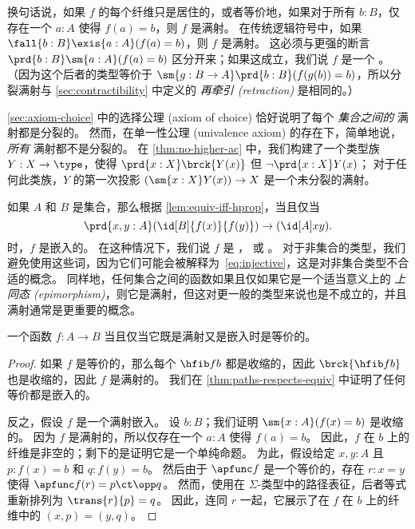 换句话说，如果 $f$ 的每个纤维只是居住的，或者等价地，如果对于所有 $b:B$，仅存在一个 $a:A$ 使得 $f(a)=b$，则 $f$ 是满射。
在传统逻辑符号中，如果 $\fall{b:B}\exis{a:A} (f(a)=b)$，则 $f$ 是满射。
这必须与更强的断言 $\prd{b:B}\sm{a:A} (f(a)=b)$ 区分开来；如果这成立，我们说 $f$ 是一个 。
%
%
%
%
（因为这个后者的类型等价于 $\sm{g:B\to A}\prd{b:B} (f(g(b))=b)$，所以分裂满射与 \cref{sec:contractibility} 中定义的 \emph{再牵引 (retraction)} 是相同的。）
%
%

\cref{sec:axiom-choice} 中的选择公理 (axiom of choice) 恰好说明了每个 \emph{集合之间的} 满射都是分裂的。
然而，在单一性公理 (univalence axiom) 的存在下，简单地说，\emph{所有} 满射都不是分裂的。
在 \cref{thm:no-higher-ac} 中，我们构建了一个类型族 $Y:X\to \type$，使得 $\prd{x:X} \brck{Y(x)}$ 但 $\neg \prd{x:X} Y(x)$；
对于任何此类族，$Y$ 的第一次投影 $(\sm{x:X} Y(x)) \to X$ 是一个未分裂的满射。

如果 $A$ 和 $B$ 是集合，那么根据 \cref{lem:equiv-iff-hprop}，当且仅当
\begin{equation}
  \prd{x,y:A} (\id[B]{f(x)}{f(y)}) \to (\id[A]xy).\label{eq:injective}
\end{equation}
时，$f$ 是嵌入的。
在这种情况下，我们说 $f$ 是 ，
%
%
或 。
%
对于非集合的类型，我们避免使用这些词，因为它们可能会被解释为~\eqref{eq:injective}，这是对非集合类型不合适的概念。
同样地，任何集合之间的函数如果且仅如果它是一个适当意义上的 \emph{上同态 (epimorphism)}，则它是满射，但这对更一般的类型来说也是不成立的，并且满射通常是更重要的概念。

\begin{thm}\label{thm:mono-surj-equiv}
一个函数 $f:A\to B$ 当且仅当它既是满射又是嵌入时是等价的。
\end{thm}
\begin{proof}
  如果 $f$ 是等价的，那么每个 $\hfib f b$ 都是收缩的，因此 $\brck{\hfib f b}$ 也是收缩的，因此 $f$ 是满射的。
  我们在 \cref{thm:paths-respects-equiv} 中证明了任何等价都是嵌入的。

  反之，假设 $f$ 是一个满射嵌入。
  设 $b:B$；我们证明 $\sm{x:A}(f(x)=b)$ 是收缩的。
  因为 $f$ 是满射的，所以仅存在一个 $a:A$ 使得 $f(a)=b$。
  因此，$f$ 在 $b$ 上的纤维是非空的；剩下的是证明它是一个单纯命题。
  为此，假设给定 $x,y:A$ 且 $p:f(x)=b$ 和 $q:f(y)=b$。
  然后由于 $\apfunc f$ 是一个等价的，存在 $r:x=y$ 使得 $\apfunc f (r) = p \ct \opp q$。
  然而，使用在 $\Sigma$-类型中的路径表征，后者等式重新排列为 $\trans{r}{p} = q$。
  因此，连同 $r$ 一起，它展示了在 $f$ 在 $b$ 上的纤维中的 $(x,p) = (y,q)$。
\end{proof}

